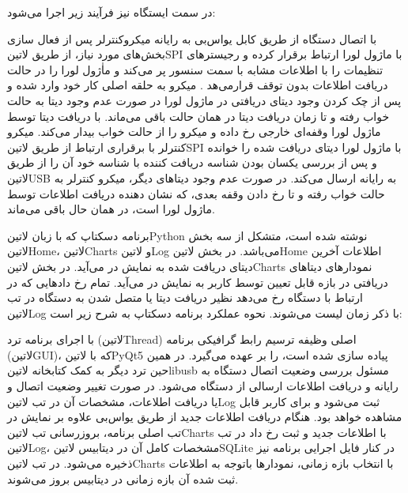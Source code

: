 در سمت ایستگاه نیز فرآیند زیر اجرا می‌شود:

با اتصال دستگاه از طریق کابل یو‌اس‌بی به رایانه میکروکنترلر پس از فعال سازی بخش‌های مورد نیاز، از طریق ‌لاتین{SPI} با ماژول لورا ارتباط برقرار کرده و رجیستر‌های تنظیمات را با اطلاعات مشابه با سمت سنسور پر می‌کند و ماٰژول لورا را در حالت دریافت اطلاعات بدون توقف قرار‌می‌هد .
میکرو به حلقه اصلی کار خود وارد شده و پس از چک کردن وجود دیتای دریافتی در ماژول لورا در صورت عدم وجود دیتا به حالت خواب رفته و تا زمان دریافت دیتا در همان حالت باقی می‌ماند.
با دریافت دیتا توسط ماژول لورا وقفه‌ای خارجی رخ داده و میکرو را از حالت خواب بیدار می‌کند.
میکرو کنترلر با برقراری ارتباط از طریق ‌لاتین{SPI} با ماژول لورا دیتای دریافت شده را خوانده و پس از بررسی یکسان بودن شناسه دریافت کننده با شناسه خود آن را از طریق ‌لاتین{USB} به رایانه ارسال می‌کند.
در صورت عدم وجود دیتا‌های دیگر، میکرو کنترلر به حالت خواب رفته و تا رخ دادن وقفه بعدی، که نشان دهنده دریافت اطلاعات توسط ماژول لورا است، در همان حال باقی می‌ماند.

برنامه دسکتاپ که با زبان ‌لاتین{Python} نوشته شده است، متشکل از سه بخش ‌لاتین{Home}، ‌لاتین{Charts} و ‌لاتین{Log} می‌باشد. در بخش ‌لاتین{Home} اطلاعات آخرین دیتای دریافت شده به نمایش در می‌آید. در بخش ‌لاتین{Charts} نمودارهای دیتا‌های دریافتی در بازه قابل تعیین توسط کاربر به نمایش در می‌آید. تمام رخ داد‌هایی که در ارتباط با دستگاه رخ می‌دهد نظیر دریافت دیتا یا متصل شدن به دستگاه در تب ‌لاتین{Log} با ذکر زمان لیست می‌شوند. نحوه عملکرد برنامه دسکتاپ به شرح زیر است:

با اجرای برنامه ترد (‌لاتین{Thread}) اصلی وظیفه ترسیم رابط گرافیکی برنامه (‌لاتین{GUI})، که با ‌لاتین{PyQt5} پیاده سازی شده است، را بر عهده می‌گیرد.
در همین حین ترد دیگر به کمک کتابخانه ‌لاتین{libusb} مسئول بررسی وضعیت اتصال دستگاه به رایانه و دریافت اطلاعات ارسالی از دستگاه می‌شود.
در صورت تغییر وضعیت اتصال و یا دریافت اطلاعات، مشخصات آن در تب ‌لاتین{Log} ثبت می‌شود و برای کاربر قابل مشاهده خواهد بود.
هنگام دریافت اطلاعات جدید از طریق یو‌اس‌بی علاوه بر نمایش در تب اصلی برنامه، بروزرسانی تب ‌لاتین{Charts} با اطلاعات جدید و ثبت رخ داد در تب ‌لاتین{Log}، مشخصات کامل آن در دیتابیس ‌لاتین{SQLite} در کنار فایل اجرایی برنامه نیز ذخیره می‌شود. 
در تب ‌لاتین{Charts} با انتخاب بازه زمانی، نمودار‌ها باتوجه به اطلاعات ثبت شده آن بازه زمانی در دیتابیس بروز می‌شوند.


